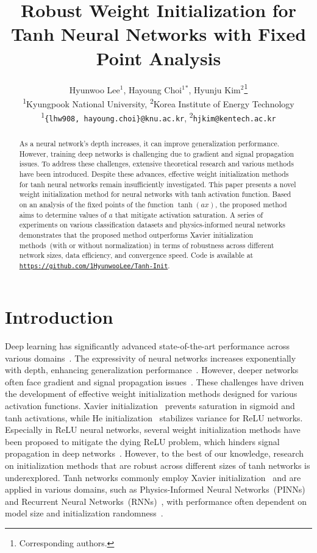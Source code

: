 \documentclass{article} \usepackage{iclr2025_conference,times}
\title{Robust Weight Initialization for Tanh Neural Networks with Fixed Point Analysis}
\author{Hyunwoo Lee$^1$,\: Hayoung Choi$^1$$^*$,\: Hyunju Kim$^2$\thanks{Corresponding authors.} \\
\textsuperscript{1}Kyungpook National University, \:
\textsuperscript{2}Korea Institute of Energy Technology\\
\textsuperscript{1}\texttt{\{lhw908, hayoung.choi\}@knu.ac.kr}, \:
\textsuperscript{2}\texttt{hjkim@kentech.ac.kr} 
}
\begin{document}
\maketitle

\begin{abstract}

As a neural network's depth increases, it can improve generalization performance. However, training deep networks is challenging due to gradient and signal propagation issues. To address these challenges, extensive theoretical research and various methods have been introduced. Despite these advances, effective weight initialization methods for tanh neural networks remain insufficiently investigated. This paper presents a novel weight initialization method for neural networks with tanh activation function. Based on an analysis of the fixed points of the function $\tanh(ax)$, the proposed method aims to determine values of $a$ that mitigate activation saturation. A series of experiments on various classification datasets and physics-informed neural networks demonstrates that the proposed method outperforms Xavier initialization methods~(with or without normalization) in terms of robustness across different network sizes, data efficiency, and convergence speed. Code is available at \href{https://github.com/1HyunwooLee/Tanh-Init}{\texttt{https://github.com/1HyunwooLee/Tanh-Init}}.

\end{abstract}

\section{Introduction}
Deep learning has significantly advanced state-of-the-art performance across various domains~\citep{lecun2015deep, he2016deep}. The expressivity of neural networks increases exponentially with depth, enhancing generalization performance~\citep{poole2016exponential, raghu2017expressive}. However, deeper networks often face gradient and signal propagation issues~\citep{bengio1993problem}. These challenges have driven the development of effective weight initialization methods designed for various activation functions. Xavier initialization~\citep{glorot2010understanding} prevents saturation in sigmoid and tanh activations, while He initialization~\citep{he2015delving} stabilizes variance for ReLU networks. Especially in ReLU neural networks, several weight initialization methods have been proposed to mitigate the dying ReLU problem, which hinders signal propagation in deep networks~\citep{lu2019dying, lee2024improved}. However, to the best of our knowledge, research on initialization methods that are robust across different sizes of tanh networks is underexplored. 
Tanh networks commonly employ Xavier initialization~\citep{raissi2019physics, jagtap2022physics, rathore2024challenges} and are applied in various domains, such as Physics-Informed Neural Networks~(PINNs)~\citep{raissi2019physics} and Recurrent Neural Networks~(RNNs)~\citep{rumelhart1986learning}, with performance often dependent on model size and initialization randomness~\citep{liu2022novel}.
\end{document}
